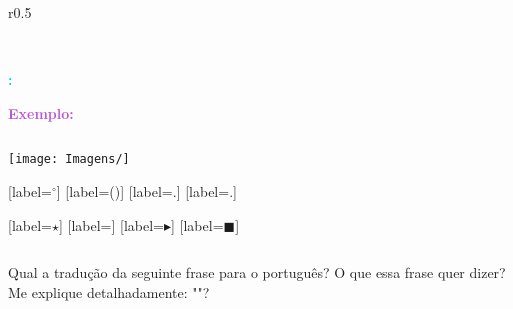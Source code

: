 \begin{figure}[h]
    \centering
    \caption{}
    \label{fig:}
\end{figure}

\begin{wrapfigure}{r}{0.5\textwidth}
    \centering
    \caption{}
    \label{fig:}
\end{wrapfigure}

\begin{figure}[h]
    \centering
     \\ %
    \caption{}
    \label{fig:}
\end{figure}

\textcolor{MediumOrchid}{\textbf{}}


\textcolor{DarkTurquoise}{\textbf{:}}

\textcolor{MediumOrchid}{\textbf{Exemplo:}}


\textcolor{CarnationPink}{$$}

\begin{center}
\texttt{[image: Imagens/]}
\end{center}

[label=\textcolor{CarnationPink}{\arabic*${}^\circ $}]
[label=\textcolor{CarnationPink}{(\alph*)}]
[label=\textcolor{CarnationPink}{\roman*.}]
[label=\textcolor{CarnationPink}{\arabic*.}]

[label=\textcolor{CarnationPink}{$\star$}]
[label=\textcolor{CarnationPink}{\textopenbullet}]
[label=\textcolor{CarnationPink}{$\blacktriangleright$}]
[label=\textcolor{CarnationPink}{$\blacksquare$}]


\textcolor{CarnationPink}{$\mathbf{}$}

\textcolor{DarkTurquoise}{\textbf{}}


\begin{tcolorbox}[width=\textwidth, colback={white}, colbacktitle={DarkTurquoise!50!white}, title={$\bigstar$ \LobsterTwo{Observação} $\bigstar $}, coltitle={CarnationPink}, colframe={DarkTurquoise}, fonttitle=\rmfamily\bfseries\Large]

\end{tcolorbox}

Qual a tradução da seguinte frase para o português?  O que essa frase quer dizer? Me explique detalhadamente: ""?

